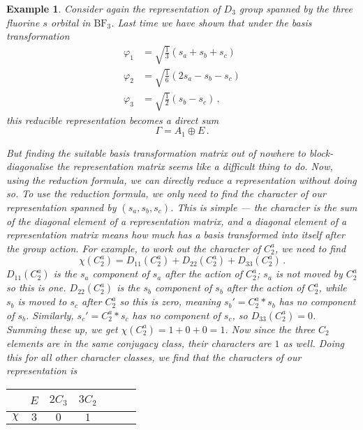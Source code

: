 \documentclass{article}
\theoremstyle{plain}\theoremheaderfont{\normalfont\itshape}\theorembodyfont{\rmfamily}\theoremseparator{.}\newtheorem*{rem}{Remark}\newtheorem*{ex}{Example}\newtheorem*{proof}{Proof}\newtheorem*{altp}{Alternative proof}
\theoremstyle{plain}\theoremheaderfont{\normalfont\bfseries}\theorembodyfont{\rmfamily}\theoremseparator{.}\newtheorem{thm}{Theorem}[section]\newtheorem{lem}[thm]{Lemma}\newtheorem{prop}[thm]{Proposition}\newtheorem*{cor}{Corollary}\newtheorem{defn}[thm]{Definition}\newtheorem{clm}[thm]{Claim}\newtheorem{clminproof}{Claim}\newtheorem*{law}{Law}\newtheorem{pos}[thm]{Postulate}
\theoremstyle{break}\theoremheaderfont{\normalfont\itshape}\theorembodyfont{\rmfamily}\theoremseparator{.\medskip}\newtheorem*{proofskip}{Proof}\newtheorem*{exs}{Examples}\newtheorem*{rems}{Remarks}
\theoremstyle{break}\theoremheaderfont{\normalfont\bfseries}\theorembodyfont{\rmfamily}\theoremseparator{.\medskip}\newtheorem{lemskip}[thm]{Lemma}\newtheorem{defnskip}[thm]{Definition}\newtheorem{propskip}[thm]{Proposition}\newtheorem{thmskip}[thm]{Theorem}
\numberwithin{equation}{section}
\begin{document}
    \begin{ex}
        Consider again the representation of \(D_3\) group spanned by the three fluorine \(s\) orbital in \(\mathrm{BF_3}\). Last time we have shown that under the basis transformation
        \begin{equation}
            \begin{aligned}
                \varphi_1&=\sqrt{\frac{1}{3}}(s_a+s_b+s_c) \\
                \varphi_2&=\sqrt{\frac{1}{6}}(2s_a-s_b-s_c) \\
                \varphi_3&=\sqrt{\frac{1}{2}}(s_b-s_c)\,,
            \end{aligned}
        \end{equation}
        this reducible representation becomes a direct sum
        \begin{equation}
            \Gamma=A_1\oplus E\,.
        \end{equation}
        
        But finding the suitable basis transformation matrix out of nowhere to block-diagonalise the representation matrix seems like a difficult thing to do. Now, using the reduction formula, we can directly reduce a representation without doing so. To use the reduction formula, we only need to find the character of our representation spanned by \((s_a,s_b,s_c)\). This is simple --- the character is the sum of the diagonal element of a representation matrix, and a diagonal element of a representation matrix means how much has a basis transformed into itself after the group action. For example, to work out the character of \(C_2^a\), we need to find
        \begin{equation}
            \chi(C_2^a)=D_{11}(C_2^a)+D_{22}(C_2^a)+D_{33}(C_2^a)\,.
        \end{equation}
        \(D_{11}(C_2^a)\) is the \(s_a\) component of \(s_a\) after the action of \(C_2^a\); \(s_a\) is not moved by \(C_2^a\) so this is one. \(D_{22}(C_2^a)\) is the \(s_b\) component of \(s_b\) after the action of \(C_2^a\), while \(s_b\) is moved to \(s_c\) after \(C_2^a\) so this is zero, meaning \(s_b'=C_2^a*s_b\) has no component of \(s_b\). Similarly, \(s_c'=C_2^a*s_c\) has no component of \(s_c\), so \(D_{33}(C_2^a)=0\). Summing these up, we get \(\chi(C_2^a)=1+0+0=1\). Now since the three \(C_2\) elements are in the same conjugacy class, their characters are \(1\) as well. Doing this for all other character classes, we find that the characters of our representation is        
        \begin{table}[H]
            \centering
            \begin{tabular}{ccccccc}
                \toprule
                ~ & \(E\) & \(2C_3\) & \(3C_2\) \\ \midrule
                \(\chi\) & \(3\) & \(0\) & \(1\) \\ \toprule
            \end{tabular}
        \end{table}


\end{ex}
\end{document}
